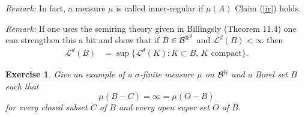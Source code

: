 \documentclass[10pt,letterpaper,twocolumn]{article}
\newtheorem{exercise}{Exercise}
\begin{document}
{\em Remark:} 
In fact, a measure $\mu$ is called inner-regular if $\mu(A)$  Claim (\ref{ir}) holds.


{\em Remark:} 
If one uses the semiring theory given in Billingsly (Theorem 11.4) one can strengthen this a bit and show that
if $B\in\mathcal B^{\Bbb R^d}$ and $\mathcal L^d(B)<\infty$ then 
\begin{align*}
\mathcal L^d(B)  &= \sup \{ \mathcal L^d(K):  K\subset B,\, \text{$K$ compact}\}.
\end{align*}

\begin{exercise}
Give an example of a $\sigma$-finite measure $\mu$ on $\mathcal B^{\Bbb R}$ and a Borel set $B$ such that 
\[ \mu(B-C)= \infty = \mu(O-B) \]
for every closed subset $C$ of $B$ and every open super set $O$ of $B$.
\end{exercise}

%
%
\end{document}

